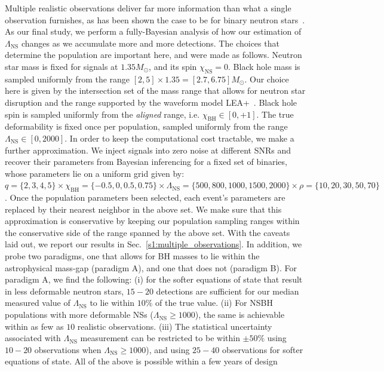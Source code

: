 \documentclass[aps,prd,amsmath,floats,floatfix, twocolumn,
superscriptaddress,nofootinbib,showpacs]{revtex4-1}
\newcommand{\lambdans}{\Lambda_\mathrm{NS}}
\newcommand{\chibh}{\chi_\mathrm{BH}}
\newcommand{\chins}{\chi_\mathrm{NS}}
\begin{document}
Multiple realistic observations deliver far more information than what a single
observation furnishes, as has been shown the case to be for binary neutron
stars~\cite{DelPozzo:13}. As our final study, we perform a fully-Bayesian 
analysis of how our estimation of $\lambdans$ changes as we accumulate more and
more detections. The choices that determine the population are important here,
and were made as follows. Neutron star mass is fixed for signals at
$1.35M_\odot$, and its spin $\chins=0$. Black hole mass is sampled uniformly
from the range $[2,5]\times 1.35=[2.7, 6.75]M_\odot$. Our choice here is given
by the intersection set of the mass range that allows for neutron star disruption
and the range supported by the waveform model LEA+~\cite{Foucart2012,
Foucart:2013a,Lackey:2013axa}. Black hole spin is sampled uniformly from the
{\it aligned} range, i.e. $\chibh\in[0,+1]$. The true deformability is fixed
once per population, sampled uniformly from the range $\lambdans\in[0,2000]$.
In order to keep the computational cost tractable, we make a further 
approximation. We inject signals into zero noise at different SNRs and recover
their parameters from Bayesian inferencing for a fixed set of binaries,
whose parameters lie on a uniform grid given by:
$q=\{2,3,4,5\}\times\chibh=\{-0.5,0,0.5,0.75\}\times\lambdans=\{500,800,1000,1500,2000\}\times\rho=\{10,20,30,50,70\}$.
Once the population parameters been selected, each event's parameters are
replaced by their nearest neighbor in the above set. We make sure that this 
approximation is conservative by keeping our population sampling ranges within the
conservative side of the range spanned by the above set. With the caveats
laid out, we report our results in Sec.~\ref{s1:multiple_observations}.
In addition, we probe two paradigms, one that allows for BH masses to lie
within the astrophysical mass-gap (paradigm A), and one that does not (paradigm
B).
% 
For paradigm A, we find the following: (i) for the softer equations of state
that result in less deformable neutron stars, $15-20$ detections are sufficient
for our median measured value of $\lambdans$ to lie within $10\%$ of the true
value. (ii) For NSBH populations with more deformable NSs
($\lambdans\geq 1000$), the same is achievable within as few as $10$ realistic
observations. (iii) The statistical uncertainty associated with $\lambdans$
measurement can be restricted to be within $\pm50\%$ using $10-20$ observations
when $\lambdans\geq 1000$), and using $25-40$ observations for softer equations
of state. All of the above is possible within a few years of design
\end{document}
